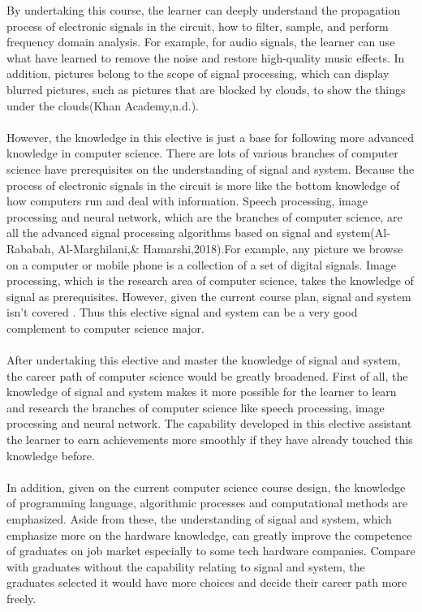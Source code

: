 \documentclass{article}
\begin{document}
	By undertaking this course, the learner can deeply understand the propagation process of electronic signals in the circuit, how to filter, sample, and perform frequency domain analysis. For example, for audio signals, the learner can use what have learned to remove the noise and restore high-quality music effects. In addition, pictures belong to the scope of signal processing, which can display blurred pictures, such as pictures that are blocked by clouds, to show the things under the clouds(Khan Academy,n.d.). \\
	\\
	However, the knowledge in this elective is just a base for following more advanced knowledge in computer science. There are lots of various branches of computer science have prerequisites on the understanding of signal and system. Because the process of electronic signals in the circuit is more like the bottom knowledge of how computers run and deal with information. Speech processing, image processing and neural network, which are the branches of computer science, are all the advanced signal processing algorithms based on signal and system(Al- Rababah, Al-Marghilani,& Hamarshi,2018).For example, any picture we browse on a computer or mobile phone is a collection of a set of digital signals. Image processing, which is the research area of computer science, takes the knowledge of signal as prerequisites. However, given the current course plan, signal and system isn't covered . Thus this elective signal and system can be a very good complement to computer science major. \\
	\\
	After undertaking this elective and master the knowledge of signal and system, the career path of computer science would be greatly broadened. First of all, the knowledge of signal and system makes it more possible for the learner to learn and research the branches of computer science like speech processing, image processing and neural network. The capability developed in this elective assistant the learner to earn achievements more smoothly if they have already touched this knowledge before.\\
	\\
	In addition, given on the current computer science course design, the knowledge of programming language, algorithmic processes and computational methods are emphasized. Aside from these, the understanding of signal and system, which emphasize more on the hardware knowledge, can greatly improve the competence of graduates on job market especially to some tech hardware companies. Compare with graduates without the capability relating to signal and system, the graduates selected it would have more choices and decide their career path more freely.
	
\end{document}
